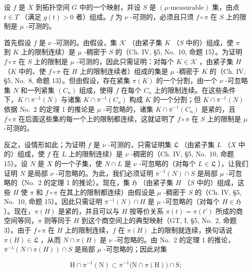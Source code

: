 设 \(f\) 是 \(X\) 到拓扑空间 \(G\) 中的一个映射，并设 \(S\) 是 \((\mu\text{-measurable})\) 集，由点 \(t \in T\) （满足 \(g(t) > 0\) 者）组成。\(f\) 为 \(\nu\) -可测的，必须且只须 \(f \circ \pi\) 在 \(S\) 上的限制是 \(\mu\) -可测的。

首先假设 \(f\) 是 \(\nu\) -可测的。由假设，集 \(\mathcal{K}\) （由紧子集 \(K\) （\(S\) 中的）组成，使 \(\pi\) 到 \(K\) 上的限制连续）是 \(\mu\) -稠密于 \(S\) 的（Ch. IV, §5, No.~10, 命题 15）。为证明 \(f \circ \pi\) 在 \(S\) 上的限制是 \(\mu\) -可测的，因此只需证明：对每个 \(K \in \mathcal{K}\) ，由紧子集 \(H\) （\(K\) 中的、使 \(f \circ \pi\) 在 \(H\) 上的限制连续者）组成的集是 \(\mu\) -稠密于 \(K\) 的（Ch. IV, §5, No.~8, 命题 13）。但由假设，存在紧集 \(\pi(K)\) 的一个分割，由一个 \(\nu\) -可忽略集 \(N\) 和一列紧集 \((C_n)\) 组成，使得 \(f\) 在每个 \(C_n\) 上的限制连续。在这些条件下，\(K \cap \overline{\pi}^{-1}(N)\) 与诸集 \(K \cap \overline{\pi}^{-1}(C_n)\) 构成 \(K\) 的一个分割；但 \(K \cap \overline{\pi}^{-1}(N)\) 依据 No.~2 的定理 1 的推论是 \(\mu\) -可忽略的，诸集 \(K \cap \overline{\pi}^{-1}(C_n)\) 是紧的，且 \(f \circ \pi\) 在后面这些集的每一个上的限制都连续，这就证明了 \(f \circ \pi\) 在 \(S\) 上的限制是 \(\mu\) -可测的。

反之，设情形如此；为证明 \(f\) 是 \(\nu\) -可测的，只需证明集 \(\mathfrak{L}\) （由紧子集 \(L\) （\(X\) 中的）组成，使 \(f\) 在 \(L\) 上的限制连续）是 \(\nu\) -稠密的（Ch. IV, §5, No.~10, 命题 15）。设 \(N\) 是 \(X\) 的一个子集，使 \(N \cap L\) 是 \(\nu\) -可忽略的（对每个 \(L \in \mathfrak{L}\) ），让我们证明 \(N\) 是局部 \(\nu\) -可忽略的。为此，我们必须证明 \(\overline{\pi}^{-1}(N) \cap S\) 是局部 \(\mu\) -可忽略的（No.~2 的定理 1 的推论）。现在，集 \(\mathfrak{H}\) （由紧子集 \(H\) （\(S\) 中的）组成，这些 \(H\) 使 \(\pi\) 和 \(f \circ \pi\) 在其上的限制都连续）由假设是 \(\mu\) -稠密于 \(S\) 的（Ch. IV, §5, No.~10, 命题 15）。因此只需证明 \(\overline{\pi}^{-1}(N) \cap H\) 是 \(\mu\) -可忽略的（对每个 \(H \in \mathfrak{H}\) ）。现在，\(\pi(H)\) 是紧的，并且可以与 \(H\) 按等价关系 \(\pi(t) = \pi(t')\) 所成的商空间等同，\(\pi\) 则等同于 \(H\) 到这个商空间上的典型映射（GT, I, §5, No.~2, 命题 3）。由于 \(f \circ \pi\) 在 \(H\) 上的限制连续，\(f\) 在 \(\pi(H)\) 上的限制就连续，换句话说 \(\pi(H) \in \mathfrak{L}\) ，从而 \(N \cap \pi(H)\) 是 \(\nu\) -可忽略的。由 No.~2 的定理 1 的推论，\(\overline{\pi}^{-1}(N \cap \pi(H)) \cap S\) 是局部 \(\mu\) -可忽略的；因此对集

\[
\mathrm{H} \cap \overline {{\pi}} ^ {- 1} (\mathrm{N}) \subset \overline {{\pi}} ^ {- 1} \bigl (\mathrm{N} \cap \pi (\mathrm{H}) \bigr) \cap \mathrm{S};
\]

